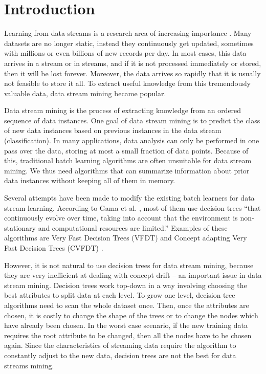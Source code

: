 \documentclass[conference]{IEEEtran}
\begin{document}
\section{Introduction}
\label{sec:introduction}

Learning from data streams is a research area of increasing importance \cite{evaluation_stream_mining}. Many datasets are no longer static, instead they continuously get updated, sometimes with millions or even billions of new records per day. In most cases, this data arrives in a stream or in streams, and if it is not processed immediately or stored, then it will be lost forever. Moreover, the data arrives so rapidly that it is usually not feasible to store it all. To extract useful knowledge from this tremendously valuable data, data stream mining became popular.

Data stream mining is the process of extracting knowledge from an ordered sequence of data instances. One goal of data stream mining is to predict the class of new data instances based on previous instances in the data stream (classification). In many applications, data analysis can only be performed in one pass over the data, storing at most a small fraction of data points. Because of this, traditional batch learning algorithms are often unsuitable for data stream mining.  We thus need algorithms that can summarize information about prior data instances without keeping all of them in memory.  

Several attempts have been made to modify the existing batch learners for data stream learning. According to Gama et al. \cite{evaluation_stream_mining}, most of them use decision trees ``that continuously evolve over time, taking into account that the environment is non-stationary and computational resources are limited.'' Examples of these algorithms are Very Fast Decision Trees (VFDT) \cite{VFDT} and Concept adapting Very Fast Decision Trees (CVFDT) \cite{CVFDT}.


However, it is not natural to use decision trees for data stream mining, because they are very inefficient at dealing with concept drift -- an important issue in data stream mining. Decision trees work top-down in a way involving choosing the best attributes to split data at each level. To grow one level, decision tree algorithms need to scan the whole dataset once. Then, once the attributes are chosen, it is costly to change the shape of the trees or to change the nodes which have already been chosen. In the worst case scenario, if the new training data requires the root attribute to be changed, then all the nodes have to be chosen again. Since the characteristics of streaming data require the algorithm to constantly adjust to the new data, decision trees are not the best for data streams mining. 
\end{document}
